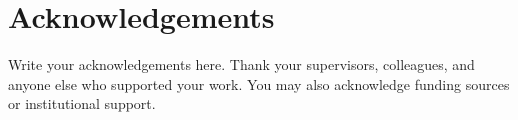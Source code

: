 \chapter*{Acknowledgements}

Write your acknowledgements here. Thank your supervisors, colleagues, and anyone else who supported your work. You may also acknowledge funding sources or institutional support.
